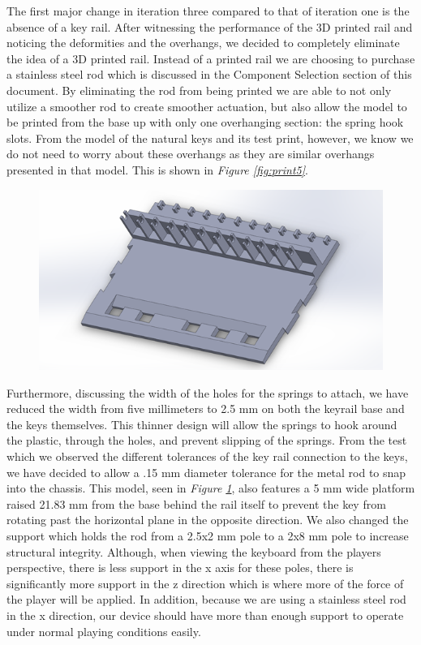 The first major change in iteration three compared to that of iteration one is the absence of a key rail. After witnessing the performance of the 3D printed rail and noticing the deformities and the overhangs, we decided to completely eliminate the idea of a 3D printed rail. Instead of a printed rail we are choosing to purchase a stainless steel rod which is discussed in the Component Selection section of this document. By eliminating the rod from being printed we are able to not only utilize a smoother rod to create smoother actuation, but also allow the model to be printed from the base up with only one overhanging section: the spring hook slots. From the model of the natural keys and its test print, however, we know we do not need to worry about these overhangs as they are similar overhangs presented in that model. This is shown in \textit{Figure \ref{fig:print5}}.

\begin{figure}[h!]
  \centering
  \includegraphics[width=0.9\linewidth]{image/BaseModel3.png}
  \caption{}
  \label{fig:base_model3}
\end{figure}

Furthermore, discussing the width of the holes for the springs to attach, we have reduced the width from five millimeters to 2.5 mm on both the keyrail base and the keys themselves. This thinner design will allow the springs to hook around the plastic, through the holes, and prevent slipping of the springs. From the test which we observed the different tolerances of the key rail connection to the keys, we have decided to allow a .15 mm diameter tolerance for the metal rod to snap into the chassis. This model, seen in \textit{Figure \ref{fig:base_model3}}, also features a 5 mm wide platform raised 21.83 mm from the base behind the rail itself to prevent the key from rotating past the horizontal plane in the opposite direction. We also changed the support which holds the rod from a 2.5x2 mm pole to a 2x8 mm pole to increase structural integrity. Although, when viewing the keyboard from the players perspective, there is less support in the x axis for these poles, there is significantly more support in the z direction which is where more of the force of the player will be applied. In addition, because we are using a stainless steel rod in the x direction, our device should have more than enough support to operate under normal playing conditions easily.

